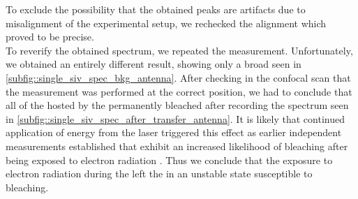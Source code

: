				To exclude the possibility that the obtained peaks are artifacts due to misalignment of the experimental setup, we rechecked the alignment which proved to be precise.
				\\
				To reverify the obtained spectrum, we repeated the measurement. Unfortunately, we obtained an entirely different result, showing only a broad \bkg seen in \cref{subfig::single_siv_spec_bkg_antenna}. After checking in the confocal scan that the measurement was performed at the correct position, we had to conclude that all of the \sivs hosted by the \nd permanently bleached after recording the spectrum seen in \cref{subfig::single_siv_spec_after_transfer_antenna}. It is likely that continued application of energy from the laser triggered this effect as earlier independent measurements established that \sivs exhibit an increased likelihood of bleaching after being exposed to electron radiation \cite{}. Thus we conclude that the exposure to electron radiation during the \pp left the \sivs in an unstable state susceptible to bleaching.

